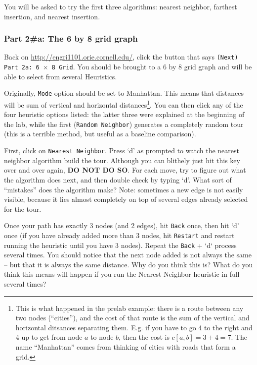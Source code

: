 \documentclass[twoside]{article}%
\begin{document}
You will be asked to try the first three algorithms: nearest neighbor, farthest insertion,
and nearest insertion. 

\subsubsection*{Part 2\#a: The 6 by 8 grid graph}

Back on \url{http://engri1101.orie.cornell.edu/}, click the button that says \texttt{(Next) Part 2a: 6 $\times$ 8 Grid}.  You should be brought to a 6 by 8 grid graph and will be able to select from several Heuristics.

Originally, \texttt{Mode} option should be set to Manhattan. This means that distances will be sum of vertical and horizontal distances\footnote{This is what happened in the prelab example: there is a route between any two nodes (``cities''), and the cost of that route is the sum of the vertical and horizontal ditsances separating them.  E.g. if you have to go 4 to the right and 4  up to get from node $a$ to node $b$, then the cost is $c[a, b]=3+4=7.$  The name ``Manhattan''  comes from thinking of cities with roads that form a grid.}. You can then click any of the four heuristic options listed: the latter three were explained at the beginning of the lab, while the first (\texttt{Random Neighbor}) generates a completely random tour (this is a terrible method, but useful as a baseline comparison).

First, click on \texttt{Nearest Neighbor}.  Press `d' as prompted to watch the nearest
neighbor algorithm build the tour. Although you can blithely just
hit this key over and over again, {\bf DO NOT DO SO}. For each
move, try to figure out what the algorithm does next, and then
double check by typing `d'. What sort of ``mistakes''
does the algorithm make? Note: sometimes a new edge is not easily
visible, because it lies almost completely on top of several edges
already selected for the tour. 

Once your path has exactly 3 nodes (and 2 edges), hit \texttt{Back} once, then hit `d' once (if you have already added more than 3 nodes, hit \texttt{Restart} and restart running the heuristic until you have 3 nodes).  Repeat the \texttt{Back} + `d` process several times.  You should  notice that the next node added is not always the same -- but that it is always the same distance.   Why do you think this is?  What do you think this means will happen if you run the Nearest Neighbor heuristic in full several times?
\end{document}
